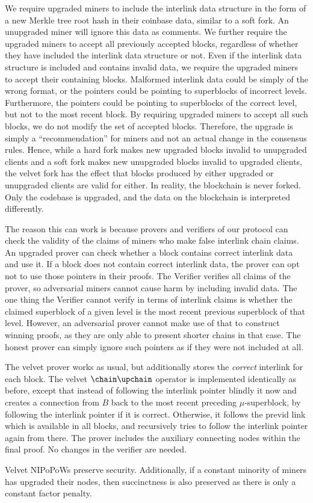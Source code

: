 We require upgraded miners to include the interlink data structure in the form
of a new Merkle tree root hash in their coinbase data, similar to a soft fork.
An unupgraded miner will ignore this data as comments. We further require the
upgraded miners to accept all previously accepted blocks, regardless of whether
they have included the interlink data structure or not. Even if the interlink
data structure is included and contains invalid data, we require the upgraded
miners to accept their containing blocks. Malformed interlink data could be
simply of the wrong format, or the pointers could be pointing to superblocks of
incorrect levels. Furthermore, the pointers could be pointing to superblocks of
the correct level, but not to the most recent block. By requiring upgraded
miners to accept all such blocks, we do not modify the set of accepted blocks.
Therefore, the upgrade is simply a ``recommendation'' for miners and not an
actual change in the consensus rules. Hence, while a hard fork makes new
upgraded blocks invalid to unupgraded clients and a soft fork makes new
unupgraded blocks invalid to upgraded clients, the velvet fork has the effect
that blocks produced by either upgraded or unupgraded clients are valid for
either. In reality, the blockchain is never forked. Only the codebase is
upgraded, and the data on the blockchain is interpreted differently.

The reason this can work is because provers and verifiers of our protocol can
check the validity of the claims of miners who make false interlink chain
claims. An upgraded prover can check whether a block contains correct interlink
data and use it. If a block does not contain correct interlink data, the prover
can opt not to use those pointers in their proofs. The Verifier verifies all
claims of the prover, so adversarial miners cannot cause harm by including
invalid data. The one thing the Verifier cannot verify in terms of interlink
claims is whether the claimed superblock of a given level is the most recent
previous superblock of that level. However, an adversarial prover cannot make
use of that to construct winning proofs, as they are only able to present
shorter chains in that case. The honest prover can simply ignore such pointers
as if they were not included at all.

The velvet prover works as usual, but additionally stores the \emph{correct}
interlink for each block. The velvet $\chain\upchain$ operator is
implemented identically as before, except that instead of following the
interlink pointer blindly it now and creates a connection from $B$ back to the
most recent preceding $\mu$-superblock, by following the interlink pointer if it
is correct. Otherwise, it follows the previd link which is available in all
blocks, and recursively tries to follow the interlink pointer again from there.
The prover includes the auxiliary connecting nodes within the final proof. No
changes in the verifier are needed.

Velvet NIPoPoWs preserve security. Additionally, if a constant minority of
miners has upgraded their nodes, then succinctness is also preserved as there is
only a constant factor penalty.
